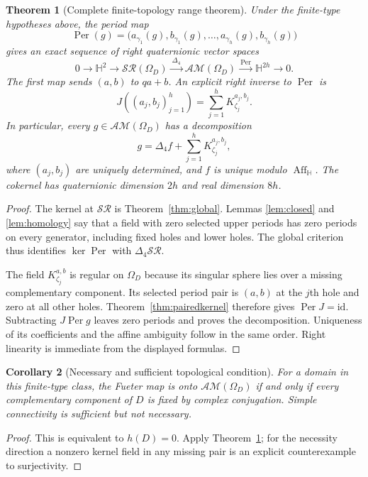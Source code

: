 \documentclass[11pt,a4paper]{article}
\numberwithin{equation}{section}
\newtheorem{theorem}{Theorem}[section]
\newtheorem{corollary}[theorem]{Corollary}
\theoremstyle{definition}
\theoremstyle{remark}
\newcommand{\HH}{\mathbb H}
\newcommand{\SR}{\mathcal{SR}}
\newcommand{\AM}{\mathcal{AM}}
\newcommand{\lap}{\Delta_4}
\newcommand{\Per}{\operatorname{Per}}
\newcommand{\aff}{\operatorname{Aff}_{\HH}}
\begin{document}
\begin{theorem}[Complete finite-topology range theorem]
\label{thm:range}
Under the finite-type hypotheses above, the period map
\[
 \Per(g)=\big(a_{\gamma_1}(g),b_{\gamma_1}(g),\ldots,
                    a_{\gamma_h}(g),b_{\gamma_h}(g)\big)
\]
gives an exact sequence of right quaternionic vector spaces
\begin{equation}
 0\longrightarrow\HH^2\longrightarrow\SR(\Omega_D)
 \xrightarrow{\ \lap\ }\AM(\Omega_D)
 \xrightarrow{\ \Per\ }\HH^{2h}\longrightarrow0.
 \label{eq:exact}
\end{equation}
The first map sends $(a,b)$ to $qa+b$. An explicit right inverse to
$\Per$ is
\begin{equation}
 J((a_j,b_j)_{j=1}^h)=\sum_{j=1}^h K_{\zeta_j}^{a_j,b_j}.
 \label{eq:splitting}
\end{equation}
In particular, every $g\in\AM(\Omega_D)$ has a decomposition
\begin{equation}
 g=\lap f+\sum_{j=1}^h K_{\zeta_j}^{a_j,b_j},
 \label{eq:decomposition}
\end{equation}
where $(a_j,b_j)$ are uniquely determined, and $f$ is unique modulo
$\aff$. The cokernel has quaternionic dimension $2h$ and real
dimension $8h$.
\end{theorem}
\begin{proof}
The kernel at $\SR$ is Theorem~\ref{thm:global}. Lemmas
\ref{lem:closed} and \ref{lem:homology} say that a field with zero
selected upper periods has zero periods on every generator, including
fixed holes and lower holes. The global criterion thus identifies
$\ker\Per$ with $\lap\SR$.

The field $K_{\zeta_j}^{a,b}$ is regular on $\Omega_D$ because its
singular sphere lies over a missing complementary component. Its selected
period pair is $(a,b)$ at the $j$th hole and zero at all other holes.
Theorem~\ref{thm:pairedkernel} therefore gives $\Per J=\mathrm{id}$.
Subtracting $J\Per g$ leaves zero periods and proves the decomposition.
Uniqueness of its coefficients and the affine ambiguity follow in the
same order. Right linearity is immediate from the displayed formulas.
\end{proof}

\begin{corollary}[Necessary and sufficient topological condition]
\label{cor:onto}
For a domain in this finite-type class, the Fueter map is onto
$\AM(\Omega_D)$ if and only if every complementary component of $D$
is fixed by complex conjugation. Simple connectivity is sufficient but
not necessary.
\end{corollary}
\begin{proof}
This is equivalent to $h(D)=0$. Apply Theorem~\ref{thm:range}; for the
necessity direction a nonzero kernel field in any missing pair is an
explicit counterexample to surjectivity.
\end{proof}
\end{document}
